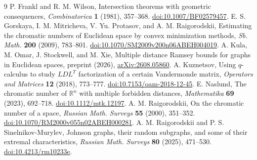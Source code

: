 \documentclass[12pt,a4paper]{article}
\newcommand{\R}{\mathbb R}
\begin{document}
\begin{thebibliography}{9}
 P. Frankl and R. M. Wilson, Intersection theorems with geometric consequences, \emph{Combinatorica} \textbf{1} (1981), 357--368. \href{https://doi.org/10.1007/BF02579457}{doi:10.1007/BF02579457}.
 E. S. Gorskaya, I. M. Mitricheva, V. Yu. Protasov, and A. M. Raigorodskii, Estimating the chromatic numbers of Euclidean space by convex minimization methods, \emph{Sb. Math.} \textbf{200} (2009), 783--801. \href{https://doi.org/10.1070/SM2009v200n06ABEH004019}{doi:10.1070/SM2009v200n06ABEH004019}.
 A. Kula, M. Omar, J. Stockwell, and M. Xie, Multiple distance Ramsey bounds for graphs in Euclidean spaces, preprint (2026), \href{https://arxiv.org/abs/2608.05860}{arXiv:2608.05860}.
 A. Kuznetsov, Using $q$-calculus to study $LDL^T$ factorization of a certain Vandermonde matrix, \emph{Operators and Matrices} \textbf{12} (2018), 773--777. \href{https://doi.org/10.7153/oam-2018-12-45}{doi:10.7153/oam-2018-12-45}.
 E. Naslund, The chromatic number of $\R^n$ with multiple forbidden distances, \emph{Mathematika} \textbf{69} (2023), 692--718. \href{https://doi.org/10.1112/mtk.12197}{doi:10.1112/mtk.12197}.
 A. M. Raigorodskii, On the chromatic number of a space, \emph{Russian Math. Surveys} \textbf{55} (2000), 351--352. \href{https://doi.org/10.1070/RM2000v055n02ABEH000281}{doi:10.1070/RM2000v055n02ABEH000281}.
 A. M. Raigorodskii and P. S. Sinelnikov-Murylev, Johnson graphs, their random subgraphs, and some of their extremal characteristics, \emph{Russian Math. Surveys} \textbf{80} (2025), 471--530. \href{https://doi.org/10.4213/rm10233e}{doi:10.4213/rm10233e}.
\end{thebibliography}
\end{document}
